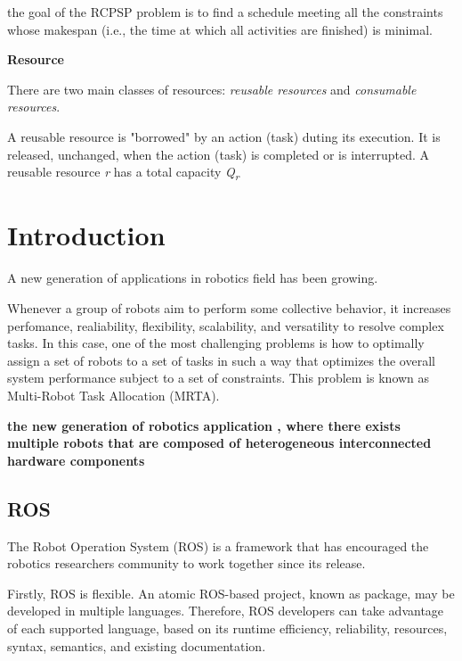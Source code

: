 the goal of the RCPSP problem is to find a schedule meeting all the constraints whose makespan (i.e., the time at which all activities are finished) is minimal.


\textbf{Resource}

There are two main classes of resources: \textit{reusable resources} and \textit{consumable resources}.

A reusable resource is "borrowed" by an action (task) duting its execution. It is released, unchanged, when the action (task) is completed or is interrupted. A reusable resource \textit{r} has a total capacity \textit{Q\textsubscript{r}}




\section{Introduction}

A new generation of applications in robotics field has been growing. 

Whenever a group of robots aim to perform some collective behavior, it increases perfomance, realiability, flexibility, scalability, and versatility to resolve complex tasks. In this case, one of the most challenging problems is how to optimally assign a set of robots to a set of tasks in such a way that optimizes the overall system performance subject to a set of constraints. This problem is known as Multi-Robot Task Allocation (MRTA).

\textbf{the new generation of robotics application \cite{ref:mohamed2008middleware}, where there exists multiple robots that are composed of heterogeneous interconnected hardware components} 

\subsection{ROS}

The Robot Operation System (ROS) \cite{ref:quigley2009ros} is a framework that has encouraged the robotics researchers community to work together since its release. 

Firstly, ROS is flexible. An atomic ROS-based project, known as package, may be developed in multiple languages. Therefore, ROS developers can take advantage of each supported language, based on its runtime efficiency, reliability, resources, syntax, semantics, and existing documentation. 


